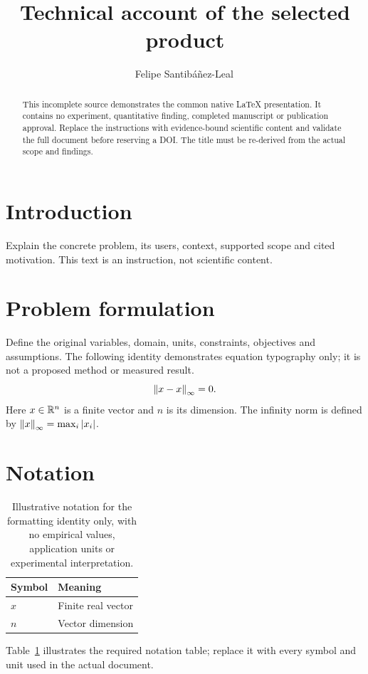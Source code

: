 \documentclass[11pt]{article}
\title{Technical account of the selected product}
\author{Felipe Santib\'a\~nez-Leal\,\orcidlink{0000-0002-0150-3246}}
\date{\docdate}
\begin{document}
\maketitle
\thispagestyle{plain}
\headerblock
\begin{abstract}
This incomplete source demonstrates the common native LaTeX presentation. It contains no experiment, quantitative finding, completed manuscript or publication approval. Replace the instructions with evidence-bound scientific content and validate the full document before reserving a DOI. The title must be re-derived from the actual scope and findings.
\end{abstract}

\section{Introduction}\label{sec:introduction}
Explain the concrete problem, its users, context, supported scope and cited motivation. This text is an instruction, not scientific content.

\section{Problem formulation}\label{sec:problem-formulation}
Define the original variables, domain, units, constraints, objectives and assumptions. The following identity demonstrates equation typography only; it is not a proposed method or measured result.
\begin{equation}\label{eq:identity} \left\lVert x-x\right\rVert_{\infty} = 0. \end{equation}
Here $x\in\mathbb{R}^n$ is a finite vector and $n$ is its dimension. The infinity norm is defined by $\left\lVert x\right\rVert_{\infty}=\max_i |x_i|$.

\section{Notation}\label{sec:notation}
\begin{table}[ht]\centering
\caption{Illustrative notation for the formatting identity only, with no empirical values, application units or experimental interpretation.}\label{tab:notation}
\begin{tabular}{ll}\toprule Symbol & Meaning \\\midrule $x$ & Finite real vector \\ $n$ & Vector dimension \\\bottomrule\end{tabular}
\end{table}
Table~\ref{tab:notation} illustrates the required notation table; replace it with every symbol and unit used in the actual document.
\end{document}
